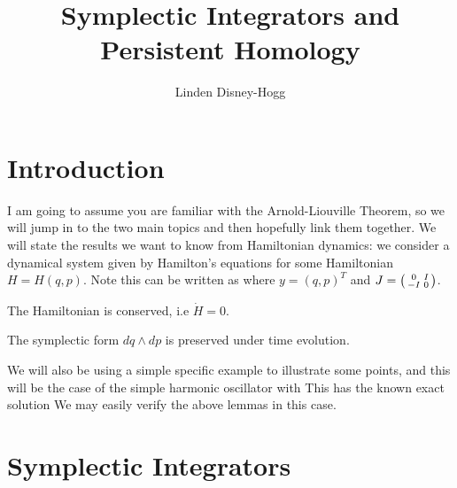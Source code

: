\documentclass{article}
\title{Symplectic Integrators and Persistent Homology}
\author{Linden Disney-Hogg}
\date{}
\begin{document}
\maketitle
\tableofcontents

\section{Introduction}
I am going to assume you are familiar with the Arnold-Liouville Theorem, so we will jump in to the two main topics and then hopefully link them together. We will state the results we want to know from Hamiltonian dynamics: we consider a dynamical system given by Hamilton's equations 
for some Hamiltonian $H=H(q,p)$. Note this can be written as 
where $y=(q,p)^T$ and $J = \begin{psmallmatrix} 0 & I \\ -I & 0 \end{psmallmatrix}$. 

\begin{lemma}
	The Hamiltonian is conserved, i.e $\dot{H}=0$. 
\end{lemma}

\begin{lemma}
	The symplectic form $dq \wedge dp$ is preserved under time evolution. 
\end{lemma}


We will also be using a simple specific example to illustrate some points, and this will be the case of the simple harmonic oscillator with 
This has the known exact solution 
We may easily verify the above lemmas in this case. 
\section{Symplectic Integrators}
\end{document}
